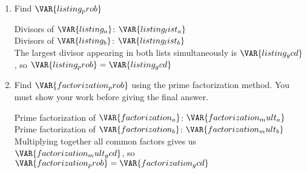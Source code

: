 
\begin{enumerate}

    \item Find $\VAR{listing_prob}$ 

    \vfill

    \begin{ansenv}
        Divisors of $\VAR{listing_a}$: $\VAR{listing_list_a}$\\

        Divisors of $\VAR{listing_b}$: $\VAR{listing_list_b}$\\

        The largest divisor appearing in both lists simultaneously is $\VAR{listing_gcd}$, so $\VAR{listing_prob} = \VAR{listing_gcd}$
    \end{ansenv}

    \vfill

    \item Find $\VAR{factorization_prob}$ using the prime factorization method. You must show your work before giving the final answer.

    \vfill

    \begin{ansenv}
        Prime factorization of $\VAR{factorization_a}$: $\VAR{factorization_mult_a}$\\

        Prime factorization of $\VAR{factorization_b}$: $\VAR{factorization_mult_b}$\\

        Multiplying together all common factors gives us $\VAR{factorization_mult_gcd}$, so $\VAR{factorization_prob} = \VAR{factorization_gcd}$
    \end{ansenv}

    \vfill

\end{enumerate}

\trueemptypage